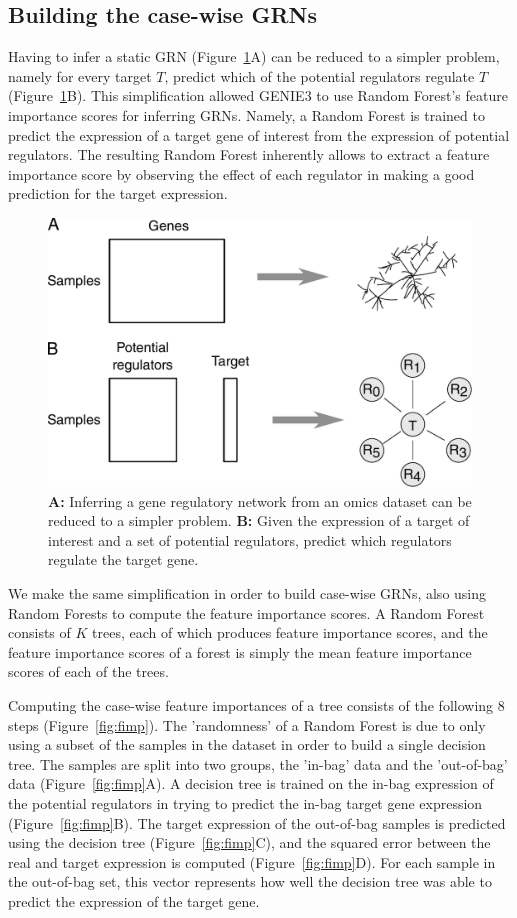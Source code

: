 \subsection{Building the case-wise GRNs}
Having to infer a static GRN (Figure~\ref{fig:simplify}A) can be reduced to a simpler problem, namely for every target $T$, predict which of the potential regulators regulate $T$ (Figure~\ref{fig:simplify}B). This simplification allowed GENIE3\cite{huynh-thu_inferringregulatorynetworks_2010} to use Random Forest's\cite{breiman_randomforests_2001} feature importance scores for inferring GRNs. Namely, a Random Forest is trained to predict the expression of a target gene of interest from the expression of potential regulators. The resulting Random Forest inherently allows to extract a feature importance score by observing the effect of each regulator in making a good prediction for the target expression.
\begin{figure}[htb!]
	\centering
	\includegraphics[width=.6\linewidth]{fig/methodology/simplify.pdf} 
	\caption{
		\textbf{A:} Inferring a gene regulatory network from an omics dataset can be reduced to a simpler problem. 
		\textbf{B:} Given the expression of a target of interest and a set of potential regulators, predict which regulators regulate the target gene.
	}
	\label{fig:simplify}
\end{figure}

We make the same simplification in order to build case-wise GRNs, also using Random Forests to compute the feature importance scores. A Random Forest consists of $K$ trees, each of which produces feature importance scores, and the feature importance scores of a forest is simply the mean feature importance scores of each of the trees. 

Computing the case-wise feature importances of a tree consists of the following 8 steps (Figure~\ref{fig:fimp}).
The 'randomness' of a Random Forest is due to only using a subset of the samples in the dataset in order to build a single decision tree. The samples are split into two groups, the 'in-bag' data and the 'out-of-bag' data (Figure~\ref{fig:fimp}A). A decision tree\cite{breiman_classificationregressiontrees_1984} is trained on the in-bag expression of the potential regulators in trying to predict the in-bag target gene expression (Figure~\ref{fig:fimp}B). The target expression of the out-of-bag samples is predicted using the decision tree (Figure~\ref{fig:fimp}C), and the squared error between the real and target expression is computed (Figure~\ref{fig:fimp}D). For each sample in the out-of-bag set, this vector represents how well the decision tree was able to predict the expression of the target gene.

